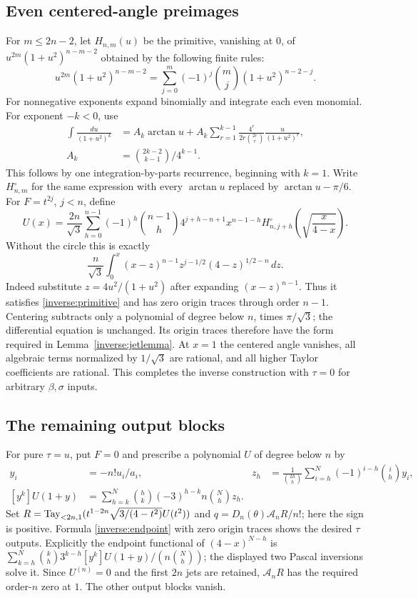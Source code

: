 \documentclass[11pt,a4paper]{article}
\numberwithin{equation}{section}
\theoremstyle{definition}\newtheorem{definition}[theorem]{Definition}
\theoremstyle{remark}\newtheorem{remark}[theorem]{Remark}
\newcommand{\A}{\mathcal A}\newcommand{\Vd}{\mathcal V}\newcommand{\Rp}{\mathbb Z_{(p)}}
\newcommand{\Tr}{\mathop{\rm Tay}\nolimits_{<2n,1}}
\begin{document}
\subsection{Even centered-angle preimages}
For $m\le2n-2$, let $H_{n,m}(u)$ be the primitive, vanishing at $0$, of
$u^{2m}(1+u^2)^{n-m-2}$ obtained by the following finite rules:
\[
 u^{2m}(1+u^2)^{n-m-2}
 =\sum_{j=0}^{m}(-1)^j\binom mj(1+u^2)^{n-2-j}.
\]
For nonnegative exponents expand binomially and integrate each even monomial. For exponent $-k<0$, use
\begin{align}
 \int\frac{du}{(1+u^2)^k}
 &=A_k\arctan u+
 A_k\sum_{r=1}^{k-1}\frac{4^r}{2r\binom{2r}r}
                \frac{u}{(1+u^2)^r},\label{inverse:primitiveR}\\
 A_k&=\binom{2k-2}{k-1}/4^{k-1}.\nonumber
\end{align}
This follows by one integration-by-parts recurrence, beginning with $k=1$.
Write $H_{n,m}^{\circ}$ for the same expression with every $\arctan u$ replaced by $\arctan u-\pi/6$.
For $F=t^{2j}$, $j<n$, define
\begin{equation}\label{inverse:evenprimitive}
 U(x)=\frac{2n}{\sqrt3}\sum_{h=0}^{n-1}(-1)^h\binom{n-1}h
       4^{j+h-n+1}x^{n-1-h}
 H_{n,j+h}^{\circ}\left(\sqrt{\frac{x}{4-x}}\right).
\end{equation}
Without the circle this is exactly
\[
 \frac n{\sqrt3}\int_0^x(x-z)^{n-1}
                   z^{j-1/2}(4-z)^{1/2-n}\,dz.
\]
Indeed substitute $z=4u^2/(1+u^2)$ after expanding $(x-z)^{n-1}$. Thus it satisfies \eqref{inverse:primitive} and has zero origin traces through order $n-1$.
Centering subtracts only a polynomial of degree below $n$, times $\pi/\sqrt3$; the differential equation is unchanged. Its origin traces therefore have the form required in Lemma~\ref{inverse:jetlemma}. At $x=1$ the centered angle vanishes, all algebraic terms normalized by $1/\sqrt3$ are rational, and all higher Taylor coefficients are rational. This completes the inverse construction with $\tau=0$ for arbitrary $\beta,\sigma$ inputs.

\subsection{The remaining output blocks}
For pure $\tau=u$, put $F=0$ and prescribe a polynomial $U$ of degree below $n$ by
\begin{align*}
 y_i&=-n!u_i/a_i,&
 z_h&=\frac1{\binom{2h}h}\sum_{i=h}^{N}(-1)^{i-h}\binom ih y_i,\\
 [y^k]U(1+y)&=\sum_{h=k}^{N}\binom hk(-3)^{h-k}
                                  n\binom Nh z_h.
\end{align*}
Set $R=\Tr(t^{1-2n}\sqrt{3/(4-t^2)}U(t^2))$ and $q=D_n(\theta)\A_nR/n!$; here the sign is positive. Formula \eqref{inverse:endpoint} with zero origin traces shows the desired $\tau$ outputs. Explicitly the endpoint functional of $(4-x)^{N-h}$ is
$\sum_{k=h}^{N}\binom kh3^{k-h}[y^k]U(1+y)/(n\binom Nh)$; the displayed two Pascal inversions solve it. Since $U^{(n)}=0$ and the first $2n$ jets are retained, $\A_nR$ has the required order-$n$ zero at $1$. The other output blocks vanish.
\end{document}
